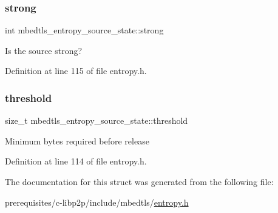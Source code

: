 \subsubsection{\texorpdfstring{strong}{strong}}
{\footnotesize\ttfamily int mbedtls\+\_\+entropy\+\_\+source\+\_\+state\+::strong}

Is the source strong? 

Definition at line 115 of file entropy.\+h.

\mbox{\label{structmbedtls__entropy__source__state_ab5ac92f3c7acd5a47ee986fb915e9686}} 
\subsubsection{\texorpdfstring{threshold}{threshold}}
{\footnotesize\ttfamily size\+\_\+t mbedtls\+\_\+entropy\+\_\+source\+\_\+state\+::threshold}

Minimum bytes required before release 

Definition at line 114 of file entropy.\+h.



The documentation for this struct was generated from the following file\+:\begin{DoxyCompactItemize}
\item 
prerequisites/c-\/libp2p/include/mbedtls/\mbox{\hyperlink{entropy_8h}{entropy.\+h}}\end{DoxyCompactItemize}
